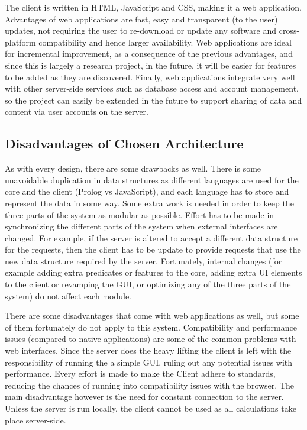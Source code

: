 \documentclass[11pt,twoside,a4paper]{report}
\begin{document}
The client is written in HTML, JavaScript and CSS, making it a web application. Advantages of web applications are fast, easy and transparent (to the user) updates, not requiring the user to re-download or update any software and cross-platform compatibility and hence larger availability. Web applications are ideal for incremental improvement, as a consequence of the previous advantages, and since this is largely a research project, in the future, it will be easier for features to be added as they are discovered. Finally, web applications integrate very well with other server-side services such as database access and account management, so the project can easily be extended in the future to support sharing of data and content via user accounts on the server.

\subsection{Disadvantages of Chosen Architecture}
As with every design, there are some drawbacks as well. There is some unavoidable duplication in data structures as different languages are used for the core and the client (Prolog vs JavaScript), and each language has to store and represent the data in some way. Some extra work is needed in order to keep the three parts of the system as modular as possible. Effort has to be made in synchronizing the different parts of the system when external interfaces are changed. For example, if the server is altered to accept a different data structure for the requests, then the client has to be update to provide requests that use the new data structure required by the server. Fortunately, internal changes (for example adding extra predicates or features to the core, adding extra UI elements to the client or revamping the GUI, or optimizing any of the three parts of the system) do not affect each module.

There are some disadvantages that come with web applications as well, but some of them fortunately do not apply to this system. Compatibility and performance issues (compared to native applications) are some of the common problems with web interfaces. Since the server does the heavy lifting the client is left with the responsibility of running the a simple GUI, ruling out any potential issues with performance. Every effort is made to make the Client adhere to standards, reducing the chances of running into compatibility issues with the browser. The main disadvantage however is the need for constant connection to the server. Unless the server is run locally, the client cannot be used as all calculations take place server-side.
\end{document}
